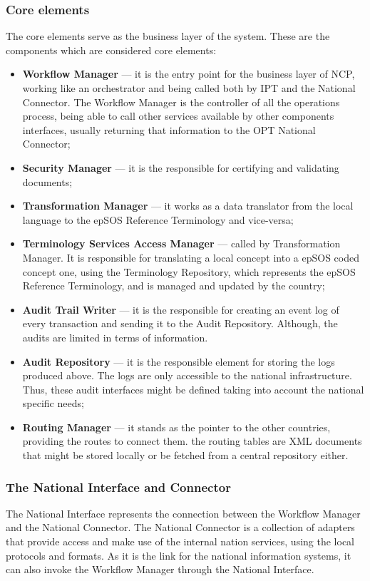 \subsubsection{Core elements}
The core elements serve as the business layer of the system. These are the components which are considered core elements:

\begin{itemize}
\item \textbf{Workflow Manager} --- it is the entry point for the business layer of NCP, working like an orchestrator and being called both by IPT and the National Connector. The Workflow Manager is the controller of all the operations process, being able to call other services available by other components interfaces, usually returning that information to the OPT National Connector;
\item \textbf{Security Manager} --- it is the responsible for certifying and validating documents;
\item \textbf{Transformation Manager} --- it works as a data translator from the local language to the epSOS Reference Terminology and vice-versa;
\item \textbf{Terminology Services Access Manager} --- called by Transformation Manager. It is responsible for translating a local concept into a epSOS coded concept one, using the Terminology Repository, which represents the epSOS Reference Terminology, and is managed and updated by the country;
\item \textbf{Audit Trail Writer} --- it is the responsible for creating an event log of every transaction and sending it to the Audit Repository. Although, the audits are limited in terms of information.
\item \textbf{Audit Repository} --- it is the responsible element for storing the logs produced above. The logs are only accessible to the national infrastructure. Thus, these audit interfaces might be defined taking into account the national specific needs;
\item \textbf{Routing Manager} --- it stands as the pointer to the other countries, providing the routes to connect them. the routing tables are XML documents that might be stored locally or be fetched from a central repository either. 
\end{itemize}

\subsubsection{The National Interface and Connector} \label{sec:epsos_ni}
The National Interface represents the connection between the Workflow Manager and the National Connector. The National Connector is a collection of adapters that provide access and make use of the internal nation services, using the local protocols and formats. As it is the link for the national information systems, it can also invoke the Workflow Manager through the National Interface.






